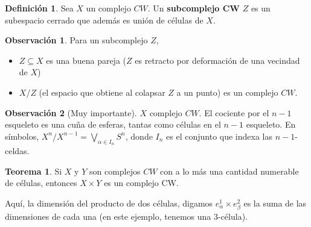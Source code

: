 \documentclass[spanish]{book}
\theoremstyle{definition}
\newtheorem*{defn}{Definición}
\newtheorem*{obs}{Observación}
\newtheorem*{teo}{Teorema}
\begin{document}
	\begin{defn}
		Sea $X$ un complejo $CW$. Un \textbf{subcomplejo CW} $Z$ es un subespacio cerrado que además es unión de células de $X$.	
	\end{defn}
	\begin{obs}
		Para un subcomplejo $Z$,
		\begin{itemize}
			\item $Z\subseteq X$ es una buena pareja ($Z$ es retracto por deformación de una vecindad de $X$)
			\item $X/Z$ (el espacio que obtiene al colapsar $Z$ a un punto) es un complejo $CW$.
		\end{itemize}
	\end{obs}
	\begin{obs}[Muy importante] $X$ complejo $CW$. El cociente por el $n-1$ esqueleto es una cuña de esferas, tantas como células en el $n-1$ esqueleto. En símbolos, $X^n/X^{n-1}=\bigvee_{\alpha\in I_n}S^n$, donde $I_n$ es el conjunto que indexa las $n-1$-celdas.
	\end{obs}
	\begin{teo}
		Si $X$ y $Y$ son complejos $CW$ con a lo más una cantidad numerable de células, entonces $X\times Y$ es un complejo CW.
	\end{teo}
	Aquí, la dimensión del producto de dos células, digamos $e^1_\alpha\times e^2_\beta$ es la suma de las dimensiones de cada una (en este ejemplo, tenemos una 3-célula).
\end{document}
